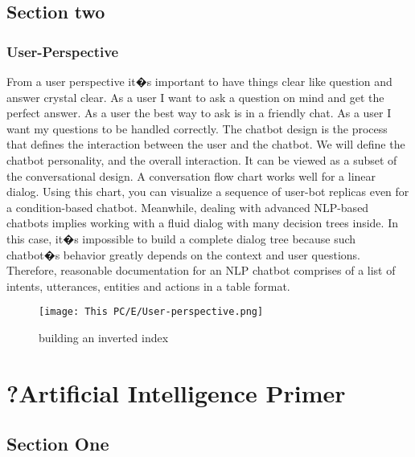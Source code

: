 \section{Section two}

  \subsection{User-Perspective}
From a user perspective it�s important to have things clear like question and answer crystal clear. 
As a user I want to ask a question on mind and get the perfect answer.
As a user the best way to ask is in a friendly chat.
As a user I want my questions to be handled correctly.
The chatbot design is the process that defines the interaction between the user and the chatbot. We will define the chatbot personality, and the overall interaction. It can be viewed as a subset of the conversational design. 
A conversation flow chart works well for a linear dialog. Using this chart, you can visualize a sequence of user-bot replicas even for a condition-based chatbot.
Meanwhile, dealing with advanced NLP-based chatbots implies working with a fluid dialog with many decision trees inside. In this case, it�s impossible to build a complete dialog tree because such chatbot�s behavior greatly depends on the context and user questions. Therefore, reasonable documentation for an NLP chatbot comprises of a list of intents, utterances, entities and actions in a table format.

\begin{figure}[H]%
    \center%
    \texttt{[image: This PC/E/User-perspective.png]}
     
    \caption[So in this, the user asks the question �How many of Warsaw�s inhabitants spoke polish in 1933?� 
The question is sent through the messenger bot to the server, then the document retriever retrieves the document that contains the answer from the context, then the answer �833,500� is read back to the user through the server.
]{building an inverted index}\label{fig:User Perspective}%
 \end{figure}

\chapter{?Artificial Intelligence Primer}
\label{chap:chap2}

\section{Section One}

